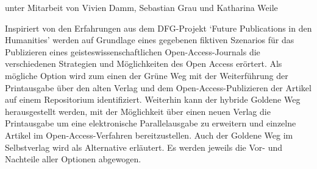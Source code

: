 unter Mitarbeit von Vivien Damm, Sebastian Grau und Katharina Weile

Inspiriert von den Erfahrungen aus dem DFG-Projekt `Future Publications
in den Humanities' werden auf Grundlage eines gegebenen fiktiven
Szenarios für das Publizieren eines geisteswissenschaftlichen
Open-Access-Journals die verschiedenen Strategien und Möglichkeiten des
Open Access erörtert. Als mögliche Option wird zum einen der Grüne Weg
mit der Weiterführung der Printausgabe über den alten Verlag und dem
Open-Access-Publizieren der Artikel auf einem Repositorium
identifiziert. Weiterhin kann der hybride Goldene Weg herausgestellt
werden, mit der Möglichkeit über einen neuen Verlag die Printausgabe um
eine elektronische Parallelausgabe zu erweitern und einzelne Artikel im
Open-Access-Verfahren bereitzustellen. Auch der Goldene Weg im
Selbstverlag wird als Alternative erläutert. Es werden jeweils die Vor-
und Nachteile aller Optionen abgewogen.
